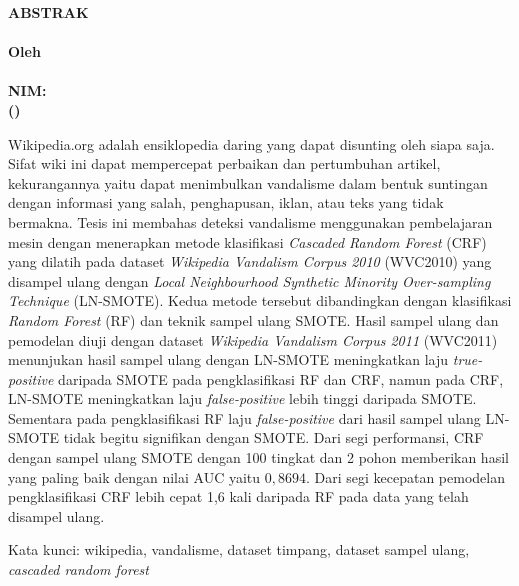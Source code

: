\begin{center}
\textbf{\large
	ABSTRAK \\
	\bigskip
	\MakeUppercase{\mytitle{}} \\
	\textnormal{\center Oleh} \\
	\myname{} \\
	NIM: \mysid{} \\
	(\mydept{}) \\
}
\end{center}

\bigskip
\bigskip
\bigskip

Wikipedia.org adalah ensiklopedia daring yang dapat disunting oleh siapa saja.
Sifat wiki ini dapat mempercepat perbaikan dan pertumbuhan artikel,
kekurangannya yaitu dapat menimbulkan vandalisme dalam bentuk suntingan dengan
informasi yang salah, penghapusan, iklan, atau teks yang tidak bermakna.
Tesis ini membahas deteksi vandalisme menggunakan pembelajaran mesin
dengan menerapkan metode klasifikasi
\textit{Cascaded Random Forest} (CRF)
yang dilatih pada dataset
\textit{Wikipedia Vandalism Corpus 2010} (WVC2010)
yang
disampel ulang dengan
\textit{Local Neighbourhood Synthetic Minority Over-sampling Technique}
(LN-SMOTE).
Kedua metode tersebut dibandingkan dengan klasifikasi
\textit{Random Forest} (RF)
dan teknik sampel ulang SMOTE.
Hasil sampel ulang dan pemodelan diuji dengan dataset
\textit{Wikipedia Vandalism Corpus 2011} (WVC2011)
menunjukan hasil sampel ulang dengan LN-SMOTE meningkatkan laju
\textit{true-positive} daripada SMOTE pada pengklasifikasi RF dan CRF, namun
pada CRF, LN-SMOTE meningkatkan laju \textit{false-positive} lebih tinggi
daripada SMOTE.
Sementara pada pengklasifikasi RF laju \textit{false-positive} dari hasil
sampel ulang LN-SMOTE tidak begitu signifikan dengan SMOTE.
Dari segi performansi, CRF dengan sampel ulang SMOTE dengan 100 tingkat dan 2
pohon memberikan hasil yang paling baik dengan nilai AUC yaitu $0,8694$.
Dari segi kecepatan pemodelan pengklasifikasi CRF lebih cepat 1,6 kali daripada
RF pada data yang telah disampel ulang.


Kata kunci: wikipedia, vandalisme, dataset timpang, dataset sampel ulang,
\textit{cascaded random forest}
